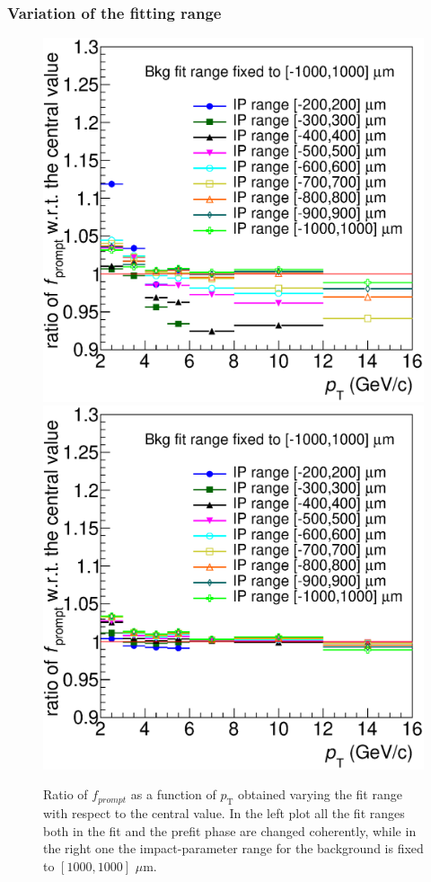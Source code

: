\documentclass[b5paper,10pt,twoside,oldstyle,classica]{toptesi}
\newcommand{\pt}{p_\text{T}}
\begin{document}
\subsubsection{Variation of the fitting range}
\begin{figure}[b]
\begin{center}
{\includegraphics[scale = 0.32]{promptfraction_syst_range_onlyratio.eps}}
\hspace{-0.6cm}
{\includegraphics[scale = 0.32]{promptfraction_syst_range_onlyratio_SBfix.eps}}
\caption{Ratio of $f_{prompt}$  as a function of $\pt$ obtained varying the fit range with respect to the central value. In the left plot all the fit ranges both in the fit and the prefit phase are changed coherently, while in the right one the impact-parameter range for the background is fixed to $[1000,1000]$ $\mu$m.}
\label{fitrange_syst}
\end{center}
\end{figure}
\end{document}
